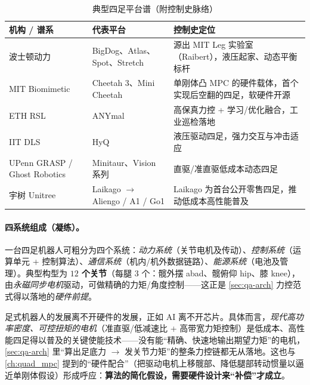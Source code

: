 \begin{table}[H]\centering\small
\caption{典型四足平台谱（附控制史脉络）\cite{unitree2023quadruped}}
\begin{tabular}{p{} p{} p{}}
\toprule
机构 / 谱系 & 代表平台 & 控制史定位 \\
\midrule
波士顿动力 & BigDog、Atlas、Spot、Stretch & 源出 MIT Leg 实验室（Raibert），液压起家、动态平衡标杆 \\
MIT Biomimetic & Cheetah 3、Mini Cheetah & 单刚体凸 MPC 的硬件载体，首个实现后空翻的四足，软硬件开源 \\
ETH RSL & ANYmal & 高保真力控 + 学习/优化融合，工业巡检落地 \\
IIT DLS & HyQ & 液压驱动四足，强力交互与冲击适应 \\
UPenn GRASP / Ghost Robotics & Minitaur、Vision 系列 & 直驱/准直驱低成本动态四足 \\
宇树 Unitree & Laikago $\to$ Aliengo / A1 / Go1 & Laikago 为首台公开零售四足，推动低成本高性能普及 \\
\bottomrule
\end{tabular}
\label{tab:qa-platforms}
\end{table}

\paragraph{四系统组成（凝练）。}
一台四足机器人可粗分为四个系统：\emph{动力系统}（关节电机及传动）、\emph{控制系统}（运算单元 + 控制算法）、\emph{通信系统}（机内/机外数据链路）、\emph{能源系统}（电池及管理）\cite{unitree2023quadruped}。典型构型为 \textbf{$12$ 个关节}（每腿 $3$ 个：髋外摆 abad、髋俯仰 hip、膝 knee），由\emph{永磁同步电机}驱动，可做精确的力矩/角度控制——这正是 \cref{sec:qa-arch} 力控范式得以落地的\emph{硬件前提}。

\begin{insight}\label{ins:qa-hardware}
足式机器人的发展离不开硬件的发展，正如 AI 离不开芯片。具体而言，\emph{现代高功率密度、可控扭矩的电机}（准直驱/低减速比 + 高带宽力矩控制）是低成本、高性能四足得以普及的关键使能技术——没有能“精确、快速地输出期望力矩”的电机，\cref{sec:qa-arch} 里“算出足底力 $\to$ 发关节力矩”的整条力控链都无从落地\cite{yu2021quadruped,unitree2023quadruped}。这也与 \cref{ch:quad_mpc} 提到的“硬件配合”（把驱动电机上移髋部、降低腿部转动惯量以逼近单刚体假设）形成呼应：\textbf{算法的简化假设，需要硬件设计来“补偿”才成立}。
\end{insight}

